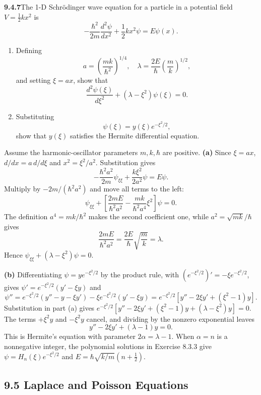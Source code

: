 \par\bigskip
\noindent\textbf{9.4.7}\quad The 1-D Schr\"odinger wave equation for a
particle in a potential field $V=\frac{1}{2}kx^{2}$ is
\[
-\frac{\hbar^{2}}{2m}\frac{d^{2}\psi}{dx^{2}}+\frac{1}{2}kx^{2}\psi=E\psi(x).
\]
\begin{enumerate}
\item[(a)] Defining
  \[
  a=\left(\frac{mk}{\hbar^{2}}\right)^{1/4},\quad
  \lambda=\frac{2E}{\hbar}\left(\frac{m}{k}\right)^{1/2},
  \]
  and setting $\xi=ax$, show that
  \[
  \frac{d^{2}\psi(\xi)}{d\xi^{2}}+(\lambda-\xi^{2})\psi(\xi)=0.
  \]
\item[(b)] Substituting
  \[
  \psi(\xi)=y(\xi)e^{-\xi^{2}/2},
  \]
  show that $y(\xi)$ satisfies the Hermite differential equation.
\end{enumerate}
\solution
Assume the harmonic-oscillator parameters $m,k,\hbar$ are positive.
\textbf{(a)} Since $\xi=ax$, $d/dx=a\,d/d\xi$ and $x^2=\xi^2/a^2$.
Substitution gives
\[
-\frac{\hbar^2a^2}{2m}\psi_{\xi\xi}
+\frac{k\xi^2}{2a^2}\psi=E\psi.
\]
Multiply by $-2m/(\hbar^2a^2)$ and move all terms to the left:
\[
\psi_{\xi\xi}+\left[\frac{2mE}{\hbar^2a^2}
 -\frac{mk}{\hbar^2a^4}\xi^2\right]\psi=0.
\]
The definition $a^4=mk/\hbar^2$ makes the second coefficient one,
while $a^2=\sqrt{mk}/\hbar$ gives
\[
\frac{2mE}{\hbar^2a^2}
=\frac{2E}{\hbar}\sqrt{\frac mk}=\lambda.
\]
Hence $\boxed{\psi_{\xi\xi}+(\lambda-\xi^2)\psi=0}$.

\textbf{(b)} Differentiating $\psi=ye^{-\xi^2/2}$ by the product rule,
with $(e^{-\xi^2/2})'=-\xi e^{-\xi^2/2}$, gives
$\psi'=e^{-\xi^2/2}(y'-\xi y)$ and
\[
\psi''=e^{-\xi^2/2}(y''-y-\xi y')-\xi e^{-\xi^2/2}(y'-\xi y)
=e^{-\xi^2/2}[y''-2\xi y'+(\xi^2-1)y].
\]
Substitution in part (a) gives
$e^{-\xi^2/2}[y''-2\xi y'+(\xi^2-1)y+(\lambda-\xi^2)y]=0$.
The terms $+\xi^2y$ and $-\xi^2y$ cancel, and dividing by the
nonzero exponential leaves
\[
\boxed{y''-2\xi y'+(\lambda-1)y=0}.
\]
This is Hermite's equation with parameter $2\alpha=\lambda-1$.
When $\alpha=n$ is a nonnegative integer, the polynomial solutions in
Exercise 8.3.3 give $\psi=H_n(\xi)e^{-\xi^2/2}$ and
$E=\hbar\sqrt{k/m}(n+\tfrac12)$.


\subsection*{9.5 Laplace and Poisson Equations}

